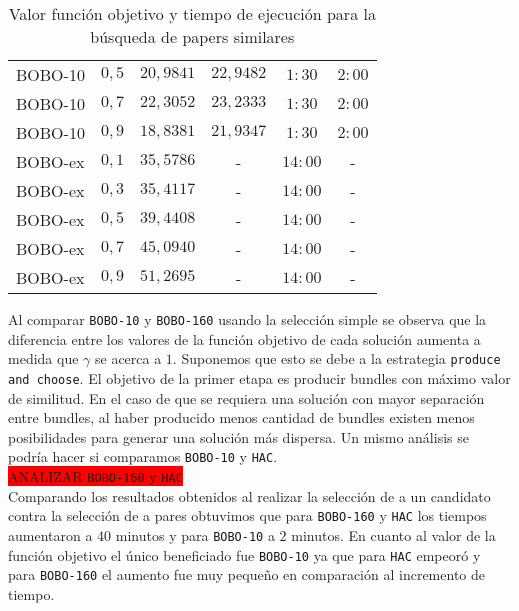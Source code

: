 \begin{table}[H]
{\begin{tabular}{|lc|cccc|}
    BOBO-10 & $0,5$ & $20,9841$  & $22,9482$ & $1:30$ & $2:00$ \\
    BOBO-10 & $0,7$ & $22,3052$  & $23,2333$ & $1:30$ & $2:00$ \\
    BOBO-10 & $0,9$ & $18,8381$  & $21,9347$ & $1:30$ & $2:00$ \\
    BOBO-ex & $0,1$ & $35,5786$  & - & $14:00$ & - \\
    BOBO-ex & $0,3$ & $35,4117$  & - & $14:00$ & - \\
    BOBO-ex & $0,5$ & $39,4408$  & - & $14:00$ & - \\
    BOBO-ex & $0,7$ & $45,0940$  & - & $14:00$ & - \\
    BOBO-ex & $0,9$ & $51,2695$  & - & $14:00$ & - \\
    \hline
    \end{tabular}
  }
  \caption {Valor función objetivo y tiempo de ejecución para la búsqueda de papers similares}
\end{table}
Al comparar \texttt{BOBO-10} y \texttt{BOBO-160} usando la selección simple se observa que la 
diferencia entre los valores de la función objetivo de cada solución aumenta a medida que $\gamma$ 
se acerca a $1$. Suponemos que esto se debe a la estrategia \texttt{produce and choose}. El 
objetivo de la primer etapa es producir bundles con máximo valor de similitud. En el caso de que se 
requiera una solución con mayor separación entre bundles, al haber producido menos cantidad de 
bundles existen menos posibilidades para generar una solución más dispersa. Un mismo análisis se 
podría hacer si comparamos \texttt{BOBO-10} y \texttt{HAC}.\\
\colorbox{red}{ANALIZAR \texttt{BOBO-160} y \texttt{HAC}}\\
Comparando los resultados obtenidos al realizar la selección de a un candidato contra la selección 
de a pares obtuvimos que para \texttt{BOBO-160} y \texttt{HAC} los tiempos aumentaron a $40$ 
minutos y para \texttt{BOBO-10} a $2$ minutos. En cuanto al valor de la función objetivo el único 
beneficiado fue \texttt{BOBO-10} ya que para \texttt{HAC} empeoró y para \texttt{BOBO-160} el 
aumento fue muy pequeño en comparación al incremento de tiempo.
